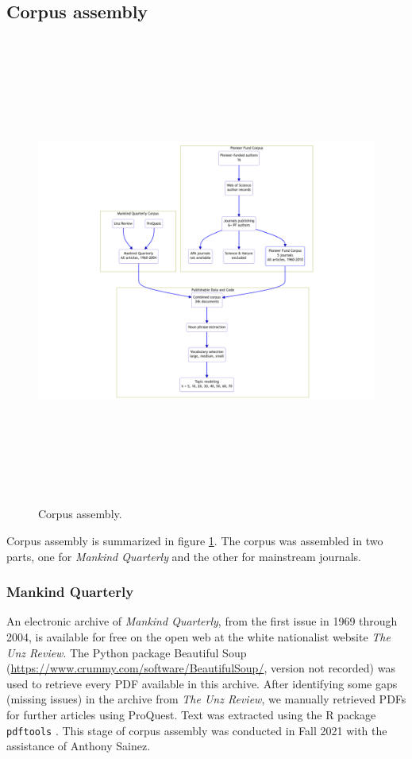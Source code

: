 \documentclass[12pt]{article}
\begin{document}
\hypertarget{corpus-assembly}{%
\subsection{Corpus assembly}\label{corpus-assembly}}

\begin{figure}
\centering
\includegraphics[width=8in,height=6.1in]{img/dataset.png}
\caption{Corpus assembly. \label{fig:corpus}}
\end{figure}

Corpus assembly is summarized in figure \ref{fig:corpus}. The corpus was assembled in two parts, one for \emph{Mankind Quarterly} and the other for mainstream journals.

\hypertarget{mankind-quarterly}{%
\subsubsection{Mankind Quarterly}\label{mankind-quarterly}}

An electronic archive of \emph{Mankind Quarterly}, from the first issue in 1969 through 2004, is available for free on the open web at the white nationalist website \emph{The Unz Review}. The Python package Beautiful Soup (\url{https://www.crummy.com/software/BeautifulSoup/}, version not recorded) was used to retrieve every PDF available in this archive. After identifying some gaps (missing issues) in the archive from \emph{The Unz Review}, we manually retrieved PDFs for further articles using ProQuest. Text was extracted using the R package \texttt{pdftools} \cite[version 3.0.1]{OomsPdftoolsTextExtraction2023}. This stage of corpus assembly was conducted in Fall 2021 with the assistance of Anthony Sainez.
\end{document}
